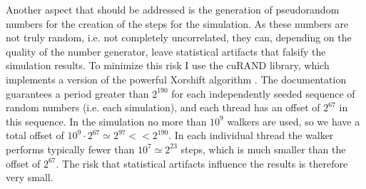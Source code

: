 Another aspect that should be addressed is the generation of pseudorandom numbers for the creation of the steps for the simulation. As these numbers are not truly random, i.e. not completely uncorrelated, they can, depending on the quality of the number generator, leave statistical artifacts that falsify the simulation results. To minimize this risk I use the cuRAND library, which implements a version of the powerful Xorshift algorithm 
\cite{marsaglia2003xorshift}. 
The documentation guarantees a period greater than $2^{190}$ for each independently seeded sequence of random numbers (i.e. each simulation), and each thread has an offset of $2^{67}$ in this sequence. In the simulation no more than $10^{9}$ walkers are used, so we have a total offset of $10^9 \cdot 2^{67}  \simeq 2^{97} << 2^{190}$. In each individual thread the walker performs typically fewer than $10^{7} \simeq 2^{23}$ steps, which is much smaller than the offset of $2^{67}$. The risk that statistical artifacts influence the results is therefore very small.


